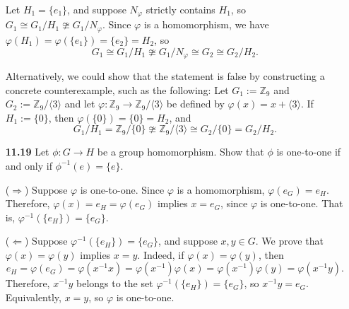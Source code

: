 \documentclass[12pt,reqno]{amsart}
\newcommand{\Z}{\ensuremath{\mathbb{Z}}}
\newcommand{\<}{\ensuremath{\langle}}
\renewcommand{\>}{\ensuremath{\rangle}}
\begin{document}
\begin{enumerate}
Let $H_1 = \{e_1\}$, and suppose $N_\varphi$ strictly contains $H_1$, so
$G_1 \cong G_1/H_1 \ncong G_1/N_\varphi$.  Since $\varphi$ is a homomorphism, we
have $\varphi(H_1) = \varphi(\{e_1\}) = \{e_2\} = H_2$, so
\[
G_1 \cong G_1/H_1 \ncong G_1/N_\varphi \cong G_2 \cong G_2/H_2.
\]

Alternatively, we could show that the statement is false by constructing a
concrete counterexample, such as the following: 
Let $G_1 := \Z_9$ and $G_2 := \Z_9/\<3\>$ and
let $\varphi : \Z_9 \rightarrow \Z_9/\<3\>$ be defined by 
$\varphi(x) = x+\<3\>$.  If $H_1:=\{0\}$, then
$\varphi(\{0\}) = \{0\} = H_2$, and 
\[
G_1/H_1 = \Z_9/\{0\} \ncong \Z_9/\<3\> \cong G_2/\{0\} = G_2/H_2.
\]

\bigskip

\item[{\bf 11.19}]
Let $\phi : G \rightarrow H$ be a group homomorphism.  Show that
$\phi$ is one-to-one if and only if $\phi^{-1}(e) = \{ e \}$.

\medskip

($\Rightarrow$) Suppose $\varphi$ is one-to-one.  Since $\varphi$ is a
homomorphism, $\varphi(e_G) = e_H$.  Therefore,
$\varphi(x) = e_H = \varphi(e_G)$ implies $x = e_G$, since $\varphi$ is
one-to-one.  That is, $\varphi^{-1}(\{e_H\})  = \{e_G\}$.

\medskip

\noindent ($\Leftarrow$) Suppose
$\varphi^{-1}(\{e_H\})  = \{e_G\}$, and suppose $x, y\in G$.
We prove that $\varphi(x) = \varphi(y)$ implies $x=y$. 
Indeed, if $\varphi(x) = \varphi(y)$, then
\[
e_H =\varphi(e_G) = \varphi(x^{-1}x) = \varphi(x^{-1})\varphi(x) =
\varphi(x^{-1})\varphi(y) =
\varphi(x^{-1}y).
\]
Therefore, $x^{-1}y$ belongs to the set $\varphi^{-1}(\{e_H\}) = \{e_G\}$, so
$x^{-1}y = e_G$.
Equivalently, $x = y$, so $\varphi$ is one-to-one.

\end{enumerate}
\end{document}
